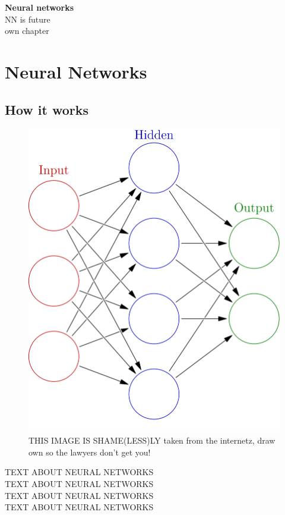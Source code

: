 	
	  \vspace{5px}
	  \textbf{Neural networks}\\
	  NN is future\\
	  own chapter\\
	  

	
\section{Neural Networks}
	  
    \subsection{How it works}
	\begin{figure}[ht!]
	    \centering
	    \includegraphics[scale=0.2]{background/figures/neural_network.png}
	    \caption{THIS IMAGE IS SHAME(LESS)LY taken from the internetz, draw own so the lawyers don't get you!}
	\end{figure}
	TEXT ABOUT NEURAL NETWORKS\\
	TEXT ABOUT NEURAL NETWORKS\\
	TEXT ABOUT NEURAL NETWORKS\\
	TEXT ABOUT NEURAL NETWORKS\\

